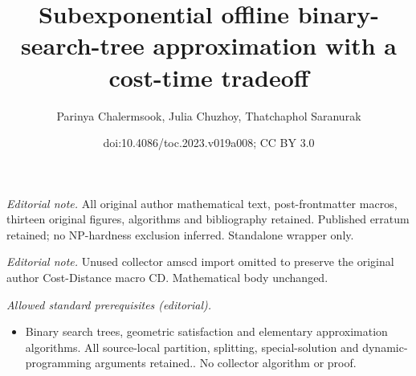 \documentclass[11pt]{article}
\title{Subexponential offline binary-search-tree approximation with a cost-time tradeoff}
\author{Parinya Chalermsook, Julia Chuzhoy, Thatchaphol Saranurak}
\date{doi:10.4086/toc.2023.v019a008; CC BY 3.0}
\numberwithin{equation}{section}
\theoremstyle{definition}
\theoremstyle{plain}
\begin{document}
\maketitle
\noindent\textit{Editorial note.} All original author mathematical text, post-frontmatter macros, thirteen original figures, algorithms and bibliography retained. Published erratum retained; no NP-hardness exclusion inferred. Standalone wrapper only.\par\medskip
\noindent\textit{Editorial note.} Unused collector amscd import omitted to preserve the original author Cost-Distance macro CD. Mathematical body unchanged.\par\medskip
\noindent\textit{Allowed standard prerequisites (editorial).}\begin{itemize}
\item Binary search trees, geometric satisfaction and elementary approximation algorithms. All source-local partition, splitting, special-solution and dynamic-programming arguments retained.. No collector algorithm or proof.
\end{itemize}\medskip

%
%
%

%

%
%
%
%
%

\newtheorem{observation}[]{Observation}

%
%
%
%
%

\newcommand{\MS}{{\sf Machine Scheduling}\xspace}
\newcommand{\RMS}{{\sf Restricted Machine Scheduling}\xspace}
\newcommand{\CM}{{\sf Congestion Minimization}\xspace}
\newcommand{\ST}{{\sf Steiner Tree}\xspace}
\newcommand{\CD}{{\sf Cost-Distance}\xspace}
\newcommand{\PST}{{\sf Priority Steiner Tree}\xspace}
\newcommand{\FCNF}{{\sf FCNF}\xspace}
\newcommand{\AC}{{\sf Asymmetric $k$-Center}\xspace}
\newcommand{\kC}{{\sf $k$-Center}\xspace}
\newcommand{\dH}{{\sf $d$-Hypergraph-Cover}\xspace}
\newcommand{\kH}{{\sf $k$-Hypergraph-Cover}\xspace}
\newcommand{\GS}{{\sf Group-Steiner-Tree}\xspace}
\newcommand{\SC}{{\sf Set-Cover}\xspace}
\newcommand{\GAPSAT}{{\sf Gap-3SAT(5)}\xspace}
\newcommand{\clique}{{\sf Max-Clique}\xspace}
\newcommand{\ML}{{\sf Metric Labeling}\xspace}
\newcommand{\ZE}{{\sf 0-extension}\xspace}
\newcommand{\ZIE}{{\sf $(0,\infty)$-extension}\xspace}
\newcommand{\sat}{{\sf SAT}\xspace}
\newcommand{\mdc}{{\sf MDC}\xspace}
\newcommand{\csp}{{\sf HA-CSP}\xspace}
\newcommand{\lw}{{\sf left}\xspace}
\newcommand{\rw}{{\sf right}\xspace}
\newcommand{\yi}{{\sc Yes-Instance}\xspace}
\renewcommand{\ni}{{\sc No-Instance}\xspace}
\end{document}
